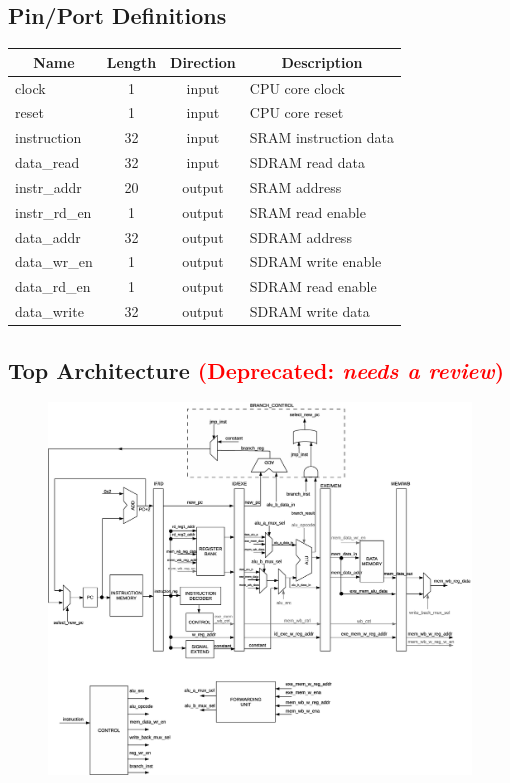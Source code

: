 \documentclass{article}
\begin{document}
 
  \subsection{Pin/Port Definitions}
  \FloatBarrier
  \begin{table}[H]
    \begin{center}
      \begin{tabular}[pos]{| l | c | c | m{7cm} |} \hline 	
      \multicolumn{1}{|c|}{\cellcolor[gray]{0.9}\textbf{Name}} & 
      \multicolumn{1}{c|}{\cellcolor[gray]{0.9}\textbf{Length}} & 
      \multicolumn{1}{c|}{\cellcolor[gray]{0.9}\textbf{Direction}} &
      \multicolumn{1}{c|}{\cellcolor[gray]{0.9}\textbf{Description}} \\ \hline
	 clock 		& 1 	& input 	& CPU core clock  	\\ \hline
	 reset 		& 1	& input		& CPU core reset  	\\ \hline
	 instruction 	& 32	& input 	& SRAM instruction data \\ \hline
	 data\_read 	& 32	& input 	& SDRAM read data \\ \hline
	 instr\_addr 	& 20	& output 	& SRAM address \\ \hline
	 instr\_rd\_en 	& 1	& output 	& SRAM read enable  \\ \hline
	 data\_addr 	& 32	& output	& SDRAM address \\ \hline
	 data\_wr\_en 	& 1	& output 	& SDRAM write enable  \\ \hline
	 data\_rd\_en 	& 1	& output 	& SDRAM read enable  \\ \hline
   data\_write   & 32 & output  & SDRAM write data  \\ \hline
      \end{tabular}
    \end{center}
  \end{table}  


\begin{landscape}
  \subsection{Top Architecture \textcolor{red}{(Deprecated: \textit{needs a review})}}
    \begin{figure}[H]
      \centering
      \includegraphics[width=.7\linewidth]{pictures/top_architecture.eps}
    \end{figure}
  \end{landscape}
\end{document}
